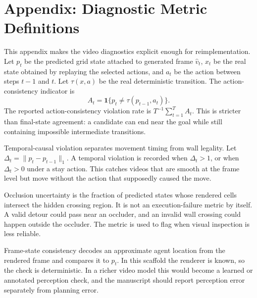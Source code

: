 \documentclass{article}
\begin{document}
\section{Appendix: Diagnostic Metric Definitions}
\label{app:metric-definitions}

This appendix makes the video diagnostics explicit enough for reimplementation. Let \(p_t\) be the predicted grid state attached to generated frame \(\hat{v}_t\), \(x_t\) be the real state obtained by replaying the selected actions, and \(a_t\) be the action between steps \(t-1\) and \(t\). Let \(\tau(x,a)\) be the real deterministic transition. The action-consistency indicator is
\[
  A_t = \mathbf{1}\{p_t \neq \tau(p_{t-1},a_t)\}.
\]
The reported action-consistency violation rate is \(T^{-1}\sum_{t=1}^{T} A_t\). This is stricter than final-state agreement: a candidate can end near the goal while still containing impossible intermediate transitions.

Temporal-causal violation separates movement timing from wall legality. Let \(\Delta_t = \lVert p_t-p_{t-1}\rVert_1\). A temporal violation is recorded when \(\Delta_t>1\), or when \(\Delta_t>0\) under a stay action. This catches videos that are smooth at the frame level but move without the action that supposedly caused the move.

Occlusion uncertainty is the fraction of predicted states whose rendered cells intersect the hidden crossing region. It is not an execution-failure metric by itself. A valid detour could pass near an occluder, and an invalid wall crossing could happen outside the occluder. The metric is used to flag when visual inspection is less reliable.

Frame-state consistency decodes an approximate agent location from the rendered frame and compares it to \(p_t\). In this scaffold the renderer is known, so the check is deterministic. In a richer video model this would become a learned or annotated perception check, and the manuscript should report perception error separately from planning error.
\end{document}
